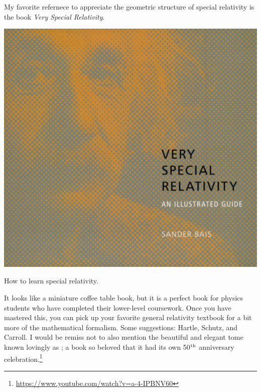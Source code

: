 \documentclass[12pt, oneside]{report}    %
\begin{document}
My favorite refernece to appreciate the geometric structure of special relativity is the book \emph{Very Special Relativity}\autocite{bais2007very}.
\begin{marginfigure}%
    \includegraphics[width=.8\textwidth]{figures/vsr_cover.png}
    \caption{How to learn special relativity.}
    \label{fig:VSR:cover}
\end{marginfigure}
It looks like a miniature coffee table book, but it is a perfect book for physics students who have completed their lower-level coursework. Once you have mastered this, you can pick up your favorite general relativity textbook for a bit more of the mathematical formalism. Some suggestions: Hartle\autocite{Hartle:2003yu}, Schutz\autocite{schutz2009first}, and Carroll\autocite{Carroll:2004st}. I would be remiss not to also mention the beautiful and elegant tome known lovingly as \autocite{misner2017gravitation}; a book so beloved that it had its own 50$^\textnormal{th}$ anniversary celebration.\footnote{\url{https://www.youtube.com/watch?v=a-4-IPBNV60}}
\end{document}

